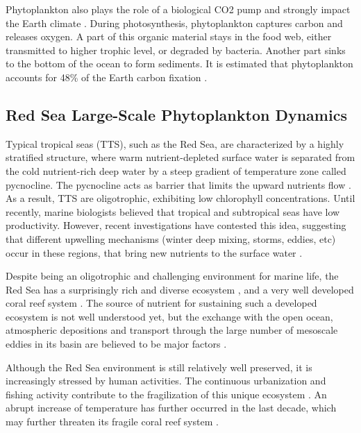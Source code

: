 Phytoplankton also plays the role of a biological CO2 pump and strongly impact
the Earth climate \citep{Mann2006}. During photosynthesis, phytoplankton
captures carbon and releases oxygen. A part of this organic material stays in
the food web, either transmitted to higher trophic level, or degraded  by
bacteria. Another part sinks to the bottom of the ocean to form sediments. It
is estimated that phytoplankton accounts for 48\% of the Earth carbon fixation
\citep{Pal2014}.

\subsection{Red Sea Large-Scale Phytoplankton Dynamics}

Typical tropical seas (TTS), such as the Red Sea, are characterized by a highly
stratified structure, where warm nutrient-depleted surface water is separated
from the cold nutrient-rich deep water by a steep gradient of temperature zone
called pycnocline. The pycnocline acts as barrier that limits the upward
nutrients flow \citep{Mann2006}. As a result, TTS are oligotrophic, exhibiting
low chlorophyll concentrations. Until recently, marine biologists believed that
tropical and subtropical seas have low productivity. However, recent
investigations have contested this idea, suggesting that different upwelling
mechanisms (winter deep mixing, storms, eddies, etc) occur in these regions,
that bring new nutrients to the surface water \citep{Mann2006}.

Despite being an oligotrophic and challenging environment for marine life, the
Red Sea has a surprisingly rich and diverse ecosystem \citep{Raitsos2011}, and
a very well developed coral reef system \citep{Racault}. The source of nutrient
for sustaining such a developed ecosystem is not well understood yet, but the
exchange with the open ocean, atmospheric depositions and transport through
the large number of mesoscale eddies in its basin are believed to be major
factors \citep{Raitsos2013, Zhan2014}.

Although the Red Sea environment is still relatively well preserved, it is
increasingly stressed by human activities. The continuous urbanization and
fishing activity contribute to the fragilization of this unique ecosystem
\citep{Acker2008}. An abrupt increase of temperature has further occurred in
the last decade, which may further threaten its fragile coral reef system
\citep{Raitsos2011}.

